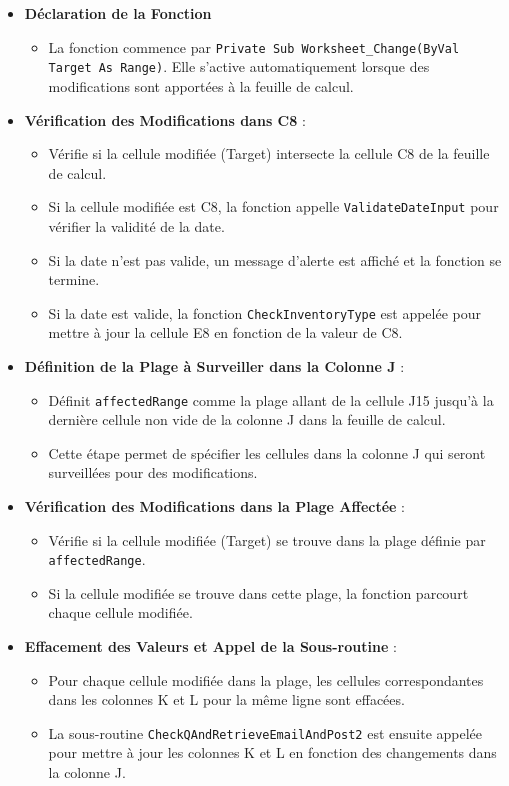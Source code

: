 \documentclass[a4paper, oneside, 12pt, final]{extreport}
\begin{document}
\begin{itemize}
    \item \textbf{Déclaration de la Fonction} 
    \begin{itemize}
        \item La fonction commence par \texttt{Private Sub Worksheet\_Change(ByVal Target As Range)}. Elle s'active automatiquement lorsque des modifications sont apportées à la feuille de calcul.
    \end{itemize}

    \item \textbf{Vérification des Modifications dans C8} :
    \begin{itemize}
        \item Vérifie si la cellule modifiée (Target) intersecte la cellule C8 de la feuille de calcul.
        \item Si la cellule modifiée est C8, la fonction appelle \texttt{ValidateDateInput} pour vérifier la validité de la date.
        \item Si la date n'est pas valide, un message d'alerte est affiché et la fonction se termine.
        \item Si la date est valide, la fonction \texttt{CheckInventoryType} est appelée pour mettre à jour la cellule E8 en fonction de la valeur de C8.
    \end{itemize}

    \item \textbf{Définition de la Plage à Surveiller dans la Colonne J} :
    \begin{itemize}
        \item Définit \texttt{affectedRange} comme la plage allant de la cellule J15 jusqu'à la dernière cellule non vide de la colonne J dans la feuille de calcul.
        \item Cette étape permet de spécifier les cellules dans la colonne J qui seront surveillées pour des modifications.
    \end{itemize}

    \item \textbf{Vérification des Modifications dans la Plage Affectée} :
    \begin{itemize}
        \item Vérifie si la cellule modifiée (Target) se trouve dans la plage définie par \texttt{affectedRange}.
        \item Si la cellule modifiée se trouve dans cette plage, la fonction parcourt chaque cellule modifiée.
    \end{itemize}

    \item \textbf{Effacement des Valeurs et Appel de la Sous-routine} :
    \begin{itemize}
        \item Pour chaque cellule modifiée dans la plage, les cellules correspondantes dans les colonnes K et L pour la même ligne sont effacées.
        \item La sous-routine \texttt{CheckQAndRetrieveEmailAndPost2} est ensuite appelée pour mettre à jour les colonnes K et L en fonction des changements dans la colonne J.
    \end{itemize}
\end{itemize}
\end{document}
